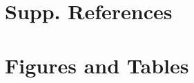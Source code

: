 \documentclass[11pt]{article} %
\begin{document}

\section{Supp. References}


\section{Figures and Tables}
\end{document}
